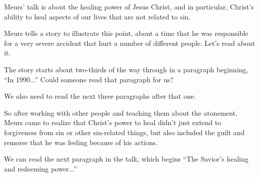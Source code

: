 		\begin{compactitem}
			
			\item Meurs' talk is about the healing power of Jesus Christ, and in particular, Christ's ability to heal aspects of our lives that are not related to sin.
			
			\item Meurs tells a story to illustrate this point, about a time that he was responsible for a very severe accident that hurt a number of different people. Let's read about it.
				\begin{compactitem}
					\item The story starts about two-thirds of the way through in a paragraph beginning, ``In 1990...'' Could someone read that paragraph for us?
					\item We also need to read the next three paragraphs after that one.
					\item So after working with other people and teaching them about the atonement, Meurs came to realize that Christ's power to heal didn't just extend to forgiveness from sin or other sin-related things, but also included the guilt and remorse that he was feeling because of his actions.
					\item We can read the next paragraph in the talk, which begins ``The Savior's healing and redeeming power...''
				\end{compactitem}
				

\end{compactitem}
